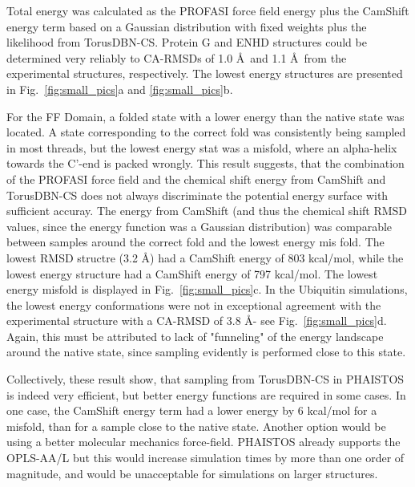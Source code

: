 Total energy was calculated as the PROFASI force field energy plus the CamShift energy term based on a Gaussian distribution with fixed weights plus the likelihood from TorusDBN-CS.
Protein G and ENHD structures could be determined very reliably to CA-RMSDs of 1.0 \AA~and 1.1 \AA~from the experimental structures, respectively. The lowest energy structures are presented in Fig.~\ref{fig:small_pics}a and \ref{fig:small_pics}b.

For the FF Domain, a folded state with a lower energy than the native state was located.
A state corresponding to the correct fold was consistently being sampled in most threads, but the lowest energy stat was a misfold, where an alpha-helix towards the C'-end is packed wrongly.
This result suggests, that the combination of the PROFASI force field and the chemical shift energy from CamShift and TorusDBN-CS does not always discriminate the potential energy surface with sufficient accuray. The energy from CamShift (and thus the chemical shift RMSD values, since the energy function was a Gaussian distribution) was comparable between samples around the correct fold and the lowest energy mis fold. The lowest RMSD structre (3.2 \AA) had a CamShift energy of 803 kcal/mol, while the lowest energy structure had a CamShift energy of 797 kcal/mol.
The lowest energy misfold is displayed in Fig.~\ref{fig:small_pics}c.
In the Ubiquitin simulations, the lowest energy conformations were not in exceptional agreement with the experimental structure with a CA-RMSD of 3.8 \AA - see Fig.~\ref{fig:small_pics}d.
 Again, this must be attributed to lack of "funneling" of the energy landscape around the native state, since sampling evidently is performed close to this state.

Collectively, these result show, that sampling from TorusDBN-CS in PHAISTOS is indeed very efficient, but better energy functions are required in some cases. In one case, the CamShift energy term had a lower energy by 6 kcal/mol for a misfold, than for a sample close to the native state.
Another option would be using a better molecular mechanics force-field. PHAISTOS already supports the OPLS-AA/L but this would increase simulation times by more than one order of magnitude, and would be unacceptable for simulations on larger structures.

